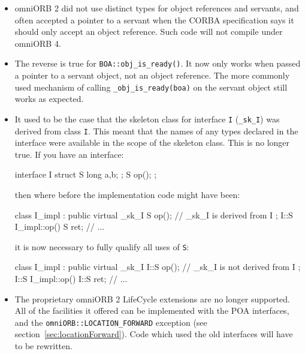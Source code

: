 \documentclass[11pt,oneside,a4paper]{book}
\newcommand{\type}[1]{\texttt{#1}}
\newcommand{\intf}[1]{\texttt{#1}}
\newcommand{\code}[1]{\texttt{#1}}
\newcommand{\op}[1]{\texttt{#1()}}
\begin{document}
\begin{itemize}

\item omniORB 2 did not use distinct types for object references and
servants, and often accepted a pointer to a servant when the CORBA
specification says it should only accept an object reference. Such
code will not compile under omniORB 4.

\item The reverse is true for \op{BOA::obj\_is\_ready}. It now only
works when passed a pointer to a servant object, not an object
reference. The more commonly used mechanism of calling
\code{\_obj\_is\_ready(boa)} on the servant object still works as
expected.

\item It used to be the case that the skeleton class for interface
\intf{I} (\type{\_sk\_I}) was derived from class \type{I}. This meant
that the names of any types declared in the interface were available
in the scope of the skeleton class. This is no longer true. If you
have an interface:

\begin{idllisting}
interface I {
  struct S {
    long a,b;
  };
  S op();
};
\end{idllisting}

\noindent then where before the implementation code might have been:

\begin{cxxlisting}
class I_impl : public virtual _sk_I {
  S op();  // _sk_I is derived from I
};
I::S I_impl::op() {
  S ret;
  // ...
}
\end{cxxlisting}

\noindent it is now necessary to fully qualify all uses of \type{S}:

\begin{cxxlisting}
class I_impl : public virtual _sk_I {
  I::S op(); // _sk_I is not derived from I
};
I::S I_impl::op() {
  I::S ret;
  // ...
}
\end{cxxlisting}


\item The proprietary omniORB 2 LifeCycle extensions are no longer
supported. All of the facilities it offered can be implemented with
the POA interfaces, and the \code{omniORB::LOCATION\_FORWARD}
exception (see section~\ref{sec:locationForward}). Code which used the
old interfaces will have to be rewritten.


\end{itemize}
\end{document}
